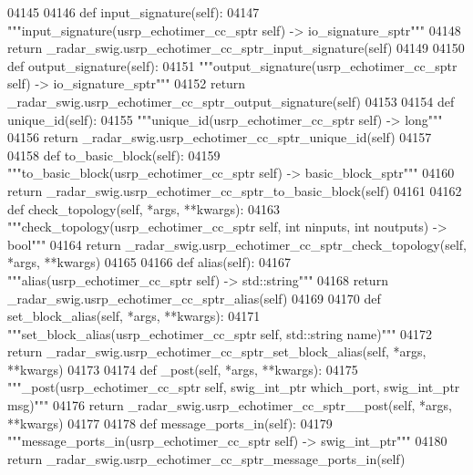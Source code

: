 \begin{DoxyCode}
{{{{{{{{{{{{{{04145 
04146     \textcolor{keyword}{def }input_signature(self):
04147         \textcolor{stringliteral}{"""input\_signature(usrp\_echotimer\_cc\_sptr self) -> io\_signature\_sptr"""}
04148         \textcolor{keywordflow}{return} \_radar\_swig.usrp\_echotimer\_cc\_sptr\_input\_signature(self)
04149 
04150     \textcolor{keyword}{def }output_signature(self):
04151         \textcolor{stringliteral}{"""output\_signature(usrp\_echotimer\_cc\_sptr self) -> io\_signature\_sptr"""}
04152         \textcolor{keywordflow}{return} \_radar\_swig.usrp\_echotimer\_cc\_sptr\_output\_signature(self)
04153 
04154     \textcolor{keyword}{def }unique_id(self):
04155         \textcolor{stringliteral}{"""unique\_id(usrp\_echotimer\_cc\_sptr self) -> long"""}
04156         \textcolor{keywordflow}{return} \_radar\_swig.usrp\_echotimer\_cc\_sptr\_unique\_id(self)
04157 
04158     \textcolor{keyword}{def }to_basic_block(self):
04159         \textcolor{stringliteral}{"""to\_basic\_block(usrp\_echotimer\_cc\_sptr self) -> basic\_block\_sptr"""}
04160         \textcolor{keywordflow}{return} \_radar\_swig.usrp\_echotimer\_cc\_sptr\_to\_basic\_block(self)
04161 
04162     \textcolor{keyword}{def }check_topology(self, *args, **kwargs):
04163         \textcolor{stringliteral}{"""check\_topology(usrp\_echotimer\_cc\_sptr self, int ninputs, int noutputs) -> bool"""}
04164         \textcolor{keywordflow}{return} \_radar\_swig.usrp\_echotimer\_cc\_sptr\_check\_topology(self, *args, **kwargs)
04165 
04166     \textcolor{keyword}{def }alias(self):
04167         \textcolor{stringliteral}{"""alias(usrp\_echotimer\_cc\_sptr self) -> std::string"""}
04168         \textcolor{keywordflow}{return} \_radar\_swig.usrp\_echotimer\_cc\_sptr\_alias(self)
04169 
04170     \textcolor{keyword}{def }set_block_alias(self, *args, **kwargs):
04171         \textcolor{stringliteral}{"""set\_block\_alias(usrp\_echotimer\_cc\_sptr self, std::string name)"""}
04172         \textcolor{keywordflow}{return} \_radar\_swig.usrp\_echotimer\_cc\_sptr\_set\_block\_alias(self, *args, **kwargs)
04173 
04174     \textcolor{keyword}{def }_post(self, *args, **kwargs):
04175         \textcolor{stringliteral}{"""\_post(usrp\_echotimer\_cc\_sptr self, swig\_int\_ptr which\_port, swig\_int\_ptr msg)"""}
04176         \textcolor{keywordflow}{return} \_radar\_swig.usrp\_echotimer\_cc\_sptr\_\_post(self, *args, **kwargs)
04177 
04178     \textcolor{keyword}{def }message_ports_in(self):
04179         \textcolor{stringliteral}{"""message\_ports\_in(usrp\_echotimer\_cc\_sptr self) -> swig\_int\_ptr"""}
04180         \textcolor{keywordflow}{return} \_radar\_swig.usrp\_echotimer\_cc\_sptr\_message\_ports\_in(self)
}}}}}}}}}}}}}}
\end{DoxyCode}
